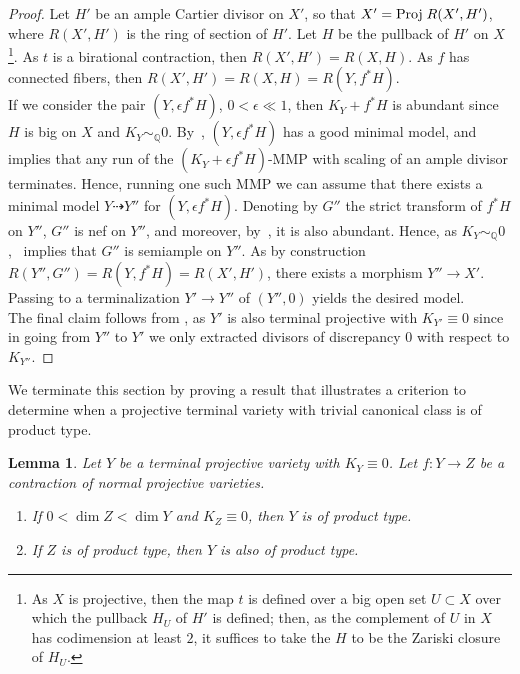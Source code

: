 \documentclass{amsart}[12pt,a4paper]
\newtheorem{lemma}[theorem]{Lemma}
\theoremstyle{definition}
\begin{document}
\begin{proof}
Let $H'$ be an ample Cartier divisor on $X'$, so that $X'={\rm Proj}\; R(X', H')$, where $R(X', H')$ is the ring of section of $H'$.
Let $H$ be the pullback of $H'$ on $X$\footnote{As $X$ is projective, then the map $t$ is defined over a big open set $U \subset X$ over which the pullback $H_U$ of $H'$ is defined; then, as the complement of $U$ in $X$ has codimension at least $2$, it suffices to take the $H$ to be the Zariski closure of $H_U$.}.
As $t$ is a birational contraction, then $R(X', H') = R(X, H)$.
As $f$ has connected fibers, then $R(X', H') = R(X, H)= R(Y, f^\ast H)$.
\\
If we consider the pair $(Y, \epsilon f^\ast H)$, $0<\epsilon\ll 1$, then $K_Y+f^\ast H$ is abundant since $H$ is big on $X$ and $K_Y \sim_
\mathbb{Q} 0$. 
By~\cite[Theorem 4.3]{GL}, $(Y, \epsilon f^\ast H)$ has a good minimal model, and~\cite[Corollary 2.9]{HX} implies that any run of the $(K_Y+\epsilon f^\ast H)$-MMP with scaling of an ample divisor terminates. 
Hence, running one such MMP we can assume that there exists a minimal model $Y\dashrightarrow Y''$ for $(Y, \epsilon f^\ast H)$.
Denoting by $G''$ the strict transform of $f^\ast H$ on $Y''$, $G''$ is nef on $Y''$, and moreover, by~\cite[Proposition~3.13, Corollary~3.14]{GL}, it is also abundant.
Hence, as $K_Y \sim_
\mathbb{Q} 0$,~\cite[Theorem~1.1]{Fuj11} implies that $G''$ is semiample on $Y''$.
As by construction $R(Y'', G'')= R(Y, f^\ast H) = R(X', H')$, there exists a morphism $Y'' \to X'$.
Passing to a terminalization $Y' \to Y''$ of $(Y'', 0)$ yields the desired model.\\
The final claim follows from \cite[Corollary~3.54]{KM}, as $Y'$ is also terminal projective with $K_{Y'} \equiv 0$ since in going from $Y''$ to $Y'$ we only extracted divisors of discrepancy $0$ with respect to $K_{Y''}$.
\end{proof}

We terminate this section by proving a result that illustrates a criterion to determine when a projective terminal variety with trivial canonical class is of product type.

\begin{lemma}
\label{lem:cy.not.prod.type}
Let $Y$ be a terminal projective variety with $K_Y \equiv 0$.
Let $f \colon Y \to Z$ be a contraction of normal projective varieties.
\begin{enumerate}
\item 
If $0< \dim Z < \dim Y$ and $K_Z \equiv 0$, then $Y$ is of product type.
\item 
If $Z$ is of product type, then $Y$ is also of product type.
\end{enumerate}
\end{lemma}
\end{document}
